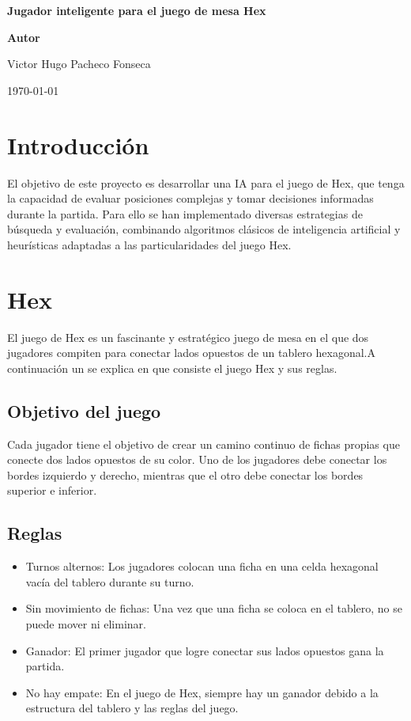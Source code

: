 \documentclass[a4paper,12pt]{article}
\begin{document}
	
	\begin{titlepage}
		\centering
		\vspace{1in}
		{\Huge \bfseries Jugador inteligente para el juego de mesa Hex \par}
		\vspace{1.5in}
		\centering
		\vspace{1in}
		{\Huge \bfseries Autor \par}
		{\Large Victor Hugo Pacheco Fonseca  \par}
		
		\vfill
		{\Large \today \par}
	\end{titlepage}
	
	\tableofcontents
	\newpage
	
	
	\section{Introducción}
	El objetivo de este proyecto es desarrollar una IA para el juego de Hex, que tenga la capacidad de evaluar posiciones complejas y tomar decisiones informadas durante la partida. Para ello se han implementado diversas estrategias de búsqueda y evaluación, combinando algoritmos clásicos de inteligencia artificial y heurísticas adaptadas a las particularidades del juego Hex.

	\section{Hex}
	El juego de Hex es un fascinante y estratégico juego de mesa en el que dos jugadores compiten para conectar lados opuestos de un tablero hexagonal.A continuación un se explica en que consiste el juego Hex y sus reglas.
	
	\subsection{Objetivo del juego}
	Cada jugador tiene el objetivo de crear un camino continuo de fichas propias que conecte dos lados opuestos de su color. Uno de los jugadores debe conectar los bordes izquierdo y derecho, mientras que el otro debe conectar los bordes superior e inferior.
	\subsection{Reglas}
	\begin{itemize}
		\item Turnos alternos: Los jugadores colocan una ficha en una celda hexagonal vacía del tablero durante su turno.
		\item Sin movimiento de fichas: Una vez que una ficha se coloca en el tablero, no se puede mover ni eliminar.
		\item Ganador: El primer jugador que logre conectar sus lados opuestos gana la partida.
		\item No hay empate: En el juego de Hex, siempre hay un ganador debido a la estructura del tablero y las reglas del juego.
	\end{itemize}
\end{document}
